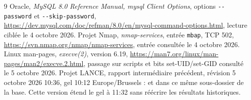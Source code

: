 \documentclass[11pt,a4paper]{article}
\newcommand{\code}[1]{{\urlstyle{tt}\nolinkurl{#1}}}
\begin{document}
{\begin{thebibliography}{9}
 Oracle, \emph{MySQL 8.0 Reference Manual, mysql Client Options}, options \code{--password} et \code{--skip-password}, \url{https://dev.mysql.com/doc/refman/8.0/en/mysql-command-options.html}, lecture ciblée le 4 octobre 2026.
 Projet Nmap, \emph{nmap-services}, entrée \code{mbap}, TCP 502, \url{https://svn.nmap.org/nmap/nmap-services}, entrée consultée le 4 octobre 2026.
 Linux man-pages, \emph{execve(2)}, version 6.19, \url{https://man7.org/linux/man-pages/man2/execve.2.html}, passage sur scripts et bits set-UID/set-GID consulté le 5 octobre 2026.
 Projet LANCE, rapport intermédiaire précédent, révision 5 octobre 2026 10:36, gel 10:12 Europe/Brussels :  et  dans ce même sous-dossier de la base. Cette version étend le gel à 11:32 sans réécrire les résultats historiques.
\end{thebibliography}
}
\end{document}

